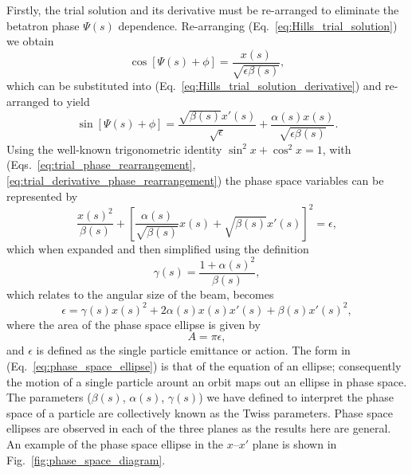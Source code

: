 \documentclass[../main.tex]{subfiles}
\begin{document}
Firstly, the trial solution and its derivative must be re-arranged to eliminate the betatron phase $\Psi\left(s\right)$ dependence. Re-arranging (Eq.~\ref{eq:Hills_trial_solution}) we obtain
\begin{equation}
\cos\left[\Psi\left(s\right)+\phi\right] = \frac{x\left(s\right)}{\sqrt{\epsilon\beta\left(s\right)}},
\label{eq:trial_phase_rearrangement}    
\end{equation}
which can be substituted into (Eq.~\ref{eq:Hills_trial_solution_derivative}) and re-arranged to yield
\begin{equation}
\sin\left[\Psi\left(s\right)+\phi\right] = \frac{\sqrt{\beta\left(s\right)}x'\left(s\right)}{\sqrt{\epsilon}} + \frac{\alpha\left(s\right)x\left(s\right)}{\sqrt{\epsilon\beta\left(s\right)}}.
\label{eq:trial_derivative_phase_rearrangement}    
\end{equation}
Using the well-known trigonometric identity $\sin^{2}x+\cos^{2}x=1$, with (Eqs.~\ref{eq:trial_phase_rearrangement}, \ref{eq:trial_derivative_phase_rearrangement}) the phase space variables can be represented by
\begin{equation}
\frac{x\left(s\right)^{2}}{\beta\left(s\right)}+\left[\frac{\alpha\left(s\right)}{\sqrt{\beta\left(s\right)}}x\left(s\right)+\sqrt{\beta\left(s\right)}x'\left(s\right)\right]^{2} = \epsilon,    
\label{eq:phase_space_trigonometry}
\end{equation}
which when expanded and then simplified using the definition
\begin{equation}
\gamma\left(s\right) = \frac{1+\alpha\left(s\right)^{2}}{\beta\left(s\right)},
\label{eq:gamma_twiss}    
\end{equation}
which relates to the angular size of the beam, becomes
\begin{equation}
\epsilon = \gamma\left(s\right)x\left(s\right)^{2}+2\alpha\left(s\right)x\left(s\right)x'\left(s\right)+\beta\left(s\right)x'\left(s\right)^{2},
\label{eq:phase_space_ellipse}    
\end{equation}
where the area of the phase space ellipse is given by
\begin{equation}
A=\pi\epsilon,
\label{eq:phase_space_area}    
\end{equation} 
and $\epsilon$ is defined as the single particle emittance or action. The form in (Eq.~\ref{eq:phase_space_ellipse}) is that of the equation of an ellipse; consequently the motion of a single particle arount an orbit maps out an ellipse in phase space. The parameters ($\beta\left(s\right)$, $\alpha\left(s\right)$, $\gamma\left(s\right)$) we have defined to interpret the phase space of a particle are collectively known as the Twiss parameters. Phase space ellipses are observed in each of the three planes as the results here are general. An example of the phase space ellipse in the $x$--$x'$ plane is shown in Fig.~\ref{fig:phase_space_diagram}.
\end{document}

